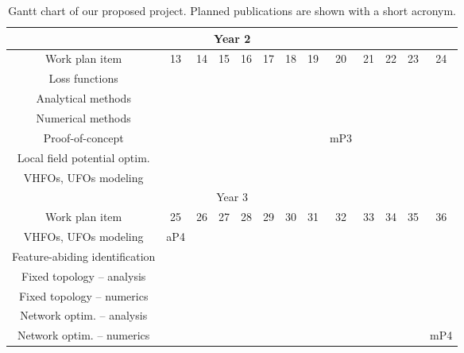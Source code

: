 \documentclass[a4paper,11pt]{scrartcl}
\begin{document}
\begin{table}[h!]
\begin{tabular}{|c|c|c|c|c|c|c|c|c|c|c|c|c|}
    \hline
    \multicolumn{13}{|c|}{\cellcolor{gray!50}Year 2} \\
        \hline
        Work plan item & 13 & 14 & 15 & 16 & 17 & 18 & 19 & 20 & 21 & 22 & 23 & 24\\
        \hline
        Loss functions & \cellcolor{purple!25} & \cellcolor{purple!25} & & & & & & & & & & \\
        \hline
        Analytical methods & \cellcolor{purple!25} & \cellcolor{purple!25} & \cellcolor{purple!25} & \cellcolor{purple!25} & \cellcolor{purple!25} & & & & & & & \\
        \hline
        Numerical methods & & & & \cellcolor{purple!25} & \cellcolor{purple!25} & \cellcolor{purple!25} & \cellcolor{purple!25} & & & & & \\
        \hline
        Proof-of-concept & & & & & & \cellcolor{purple!25} & \cellcolor{purple!25} & \cellcolor{purple!25} mP3 & & & & \\
        \hline
        Local field potential optim. & & & & & & & & \cellcolor{green!25} & \cellcolor{green!25} & \cellcolor{green!25} & & \\
        \hline
        VHFOs, UFOs modeling & & & & & & & & & & \cellcolor{green!25} & \cellcolor{green!25} & \cellcolor{green!25}\\
    \hline  
    \multicolumn{13}{|c|}{\cellcolor{gray!50}Year 3} \\
        \hline
        Work plan item & 25 & 26 & 27 & 28 & 29 & 30 & 31 & 32 & 33 & 34 & 35 & 36\\
        \hline
        VHFOs, UFOs modeling & \cellcolor{green!25} aP4 & & & & & & & & & & & \\
        \hline
        Feature-abiding identification & \cellcolor{orange!25} & \cellcolor{orange!25} & \cellcolor{orange!25} & \cellcolor{orange!25} & & & \cellcolor{orange!25} & \cellcolor{orange!25} & \cellcolor{orange!25} & \cellcolor{orange!25} & & \\
        \hline
        Fixed topology -- analysis & & & \cellcolor{yellow!25} & \cellcolor{yellow!25}  & & & & & & & & \\
        \hline
        Fixed topology -- numerics & & & & \cellcolor{yellow!25} & \cellcolor{yellow!25} & \cellcolor{yellow!25} & & & & & & \\
        \hline
        Network optim. -- analysis & & & & & & & \cellcolor{yellow!25} & \cellcolor{yellow!25} & \cellcolor{yellow!25} & \cellcolor{yellow!25} & & \\
        \hline
        Network optim. -- numerics & & & & & & & & & \cellcolor{yellow!25} & \cellcolor{yellow!25} & \cellcolor{yellow!25} & \cellcolor{yellow!25} mP4 \\
        \hline
    \end{tabular}
\caption{Gantt chart of our proposed project. Planned publications are shown with a short acronym.}    
\label{tab:Gantt}
\end{table}
\end{document}
